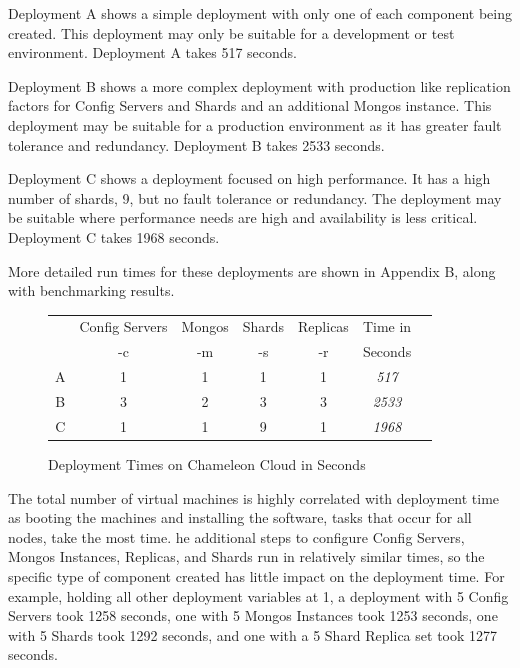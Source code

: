 \documentclass[9pt,twocolumn,twoside]{styles/osajnl}
\begin{document}
Deployment A shows a simple deployment with only one of each component being created.  This deployment may only be suitable for a development or test environment.  Deployment A takes 517 seconds.

Deployment B shows a more complex deployment with production like replication factors for Config Servers and Shards and an additional Mongos instance.  This deployment may be suitable for a production environment as it has greater fault tolerance and redundancy.  Deployment B takes 2533 seconds.

Deployment C shows a deployment focused on high performance.  It has a high number of shards, 9, but no fault tolerance or redundancy.  The deployment may be suitable where performance needs are high and availability is less critical.  Deployment C takes 1968 seconds.

More detailed run times for these deployments are shown in Appendix B, along with benchmarking results.

\begin{figure}[ht]
\begin{center}
 \begin{tabular}{| c | c | c | c | c | c | c |} 
 \hline
 & Config Servers &  Mongos & Shards & Replicas & Time in \\
& -c &  -m & -s & -r & Seconds
\\ [0.5ex] 
 \hline
 \hline
 A & 1 & 1 & 1 & 1 & \emph{517} \\
 \hline
 B & 3 & 2 & 3 & 3 & \emph{2533} \\
 \hline
 C & 1 & 1 & 9 & 1 & \emph{1968} \\ [1ex] 
 \hline
\end{tabular}
\end{center}
  \caption{Deployment Times on Chameleon Cloud in Seconds}
\end{figure}

The total number of virtual machines is highly correlated with deployment time as booting the machines and installing the software, tasks that occur for all nodes, take the most time.  he additional steps to configure Config Servers, Mongos Instances, Replicas, and Shards run in relatively similar times, so the specific type of component created has little impact on the deployment time.  For example, holding all other deployment variables at 1, a deployment with 5 Config Servers took 1258 seconds, one with 5 Mongos Instances took 1253 seconds, one with 5 Shards took 1292 seconds, and one with a 5 Shard Replica set took 1277 seconds.
\end{document}
